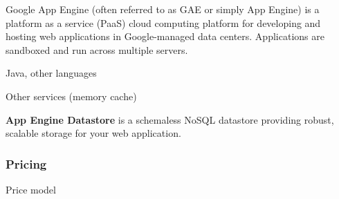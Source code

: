 Google App Engine (often referred to as GAE or simply App Engine) is a platform as a service (PaaS) cloud computing platform for developing and hosting web applications in Google-managed data centers. Applications are sandboxed and run across multiple servers.

Java, other languages
 
Other services (memory cache)

\textbf{App Engine Datastore} is a schemaless NoSQL datastore providing robust, scalable storage for your web application.

\subsubsection{Pricing}

Price model
